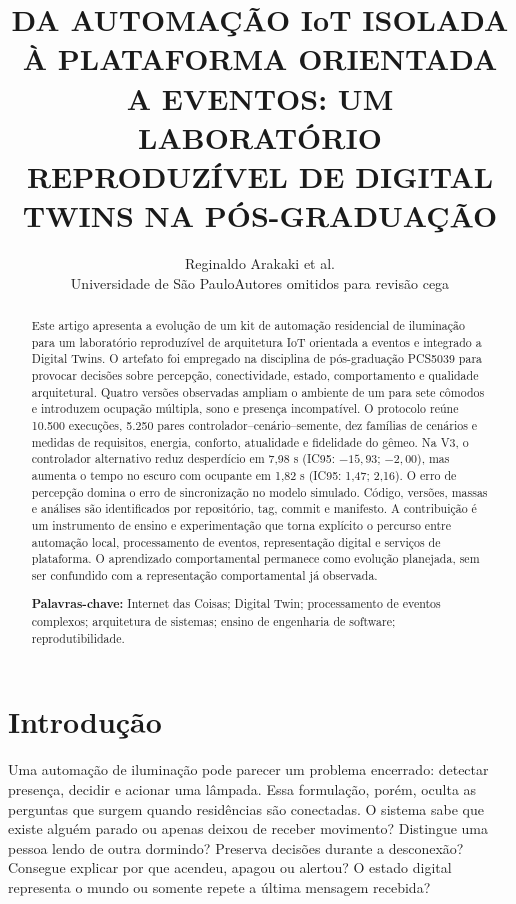 \documentclass[10pt,a4paper]{article}
\title{\vspace{-1.2cm}\bfseries\fontsize{16}{19}\selectfont DA AUTOMAÇÃO IoT ISOLADA À PLATAFORMA ORIENTADA A EVENTOS: UM LABORATÓRIO REPRODUZÍVEL DE DIGITAL TWINS NA PÓS-GRADUAÇÃO}
\author{\ifcameraReady Reginaldo Arakaki et al.\\Universidade de São Paulo\else Autores omitidos para revisão cega\fi}
\date{}
\begin{document}
\maketitle
\vspace{-1.2cm}

\begin{abstract}
Este artigo apresenta a evolução de um kit de automação residencial de iluminação para um laboratório reproduzível de arquitetura IoT orientada a eventos e integrado a Digital Twins. O artefato foi empregado na disciplina de pós-graduação PCS5039 para provocar decisões sobre percepção, conectividade, estado, comportamento e qualidade arquitetural. Quatro versões observadas ampliam o ambiente de um para sete cômodos e introduzem ocupação múltipla, sono e presença incompatível. O protocolo reúne 10.500 execuções, 5.250 pares controlador--cenário--semente, dez famílias de cenários e medidas de requisitos, energia, conforto, atualidade e fidelidade do gêmeo. Na V3, o controlador alternativo reduz desperdício em 7,98 s (IC95: $-15{,}93$; $-2{,}00$), mas aumenta o tempo no escuro com ocupante em 1,82 s (IC95: 1,47; 2,16). O erro de percepção domina o erro de sincronização no modelo simulado. Código, versões, massas e análises são identificados por repositório, tag, commit e manifesto. A contribuição é um instrumento de ensino e experimentação que torna explícito o percurso entre automação local, processamento de eventos, representação digital e serviços de plataforma. O aprendizado comportamental permanece como evolução planejada, sem ser confundido com a representação comportamental já observada.

\textbf{Palavras-chave:} Internet das Coisas; Digital Twin; processamento de eventos complexos; arquitetura de sistemas; ensino de engenharia de software; reprodutibilidade.
\end{abstract}

\section{Introdução}

Uma automação de iluminação pode parecer um problema encerrado: detectar presença, decidir e acionar uma lâmpada. Essa formulação, porém, oculta as perguntas que surgem quando residências são conectadas. O sistema sabe que existe alguém parado ou apenas deixou de receber movimento? Distingue uma pessoa lendo de outra dormindo? Preserva decisões durante a desconexão? Consegue explicar por que acendeu, apagou ou alertou? O estado digital representa o mundo ou somente repete a última mensagem recebida?
\end{document}

